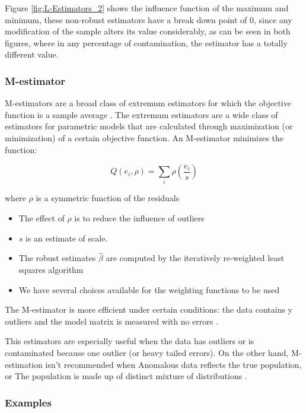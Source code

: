 \documentclass[11pt]{article}
\theoremstyle{definition}
\theoremstyle{remark}
\theoremstyle{remark}
\begin{document}
Figure \ref{fig:L-Estimators_2} shows the influence function of the
maximum and minimum, these non-robust estimators have a break down
point of 0, since any modification of the sample alters its value
considerably, as can be seen in both figures, where in any percentage
of contamination, the estimator has a totally different value.

 \subsubsection*{M-estimator}

 M-estimators are a broad class of extremum estimators for which the
 objective function is a sample average \cite{andersen2008modern}. The
 extremum estimators are a wide class of estimators for parametric
 models that are calculated through maximization (or minimization) of
 a certain objective function. An M-estimator minimizes the function:

$$Q\left(e_{i}, \rho\right)=\sum_{i} \rho\left(\frac{e_{i}}{s}\right)$$

where $\rho$ is a symmetric function of the residuals

\begin{itemize}
\item The effect of $\rho$ is to reduce the influence of outliers
\item $s$ is an estimate of scale.
\item The robust estimates $\hat{\beta}$ are computed by the
  iteratively re-weighted least squares algorithm
\item We have several choices available for the weighting functions to
  be used
\end{itemize}

The M-estimator is more efficient under certain conditions: the data
contains y outliers and the model matrix is measured with no errors
\cite{susanti2014m}.

This estimators are especially useful when the data has outliers or is
contaminated because one outlier (or heavy tailed errors). On the
other hand, M-estimation isn’t recommended when Anomalous data
reflects the true population, or The population is made up of distinct
mixture of distributions .

 \subsubsection*{Examples}
\end{document}
